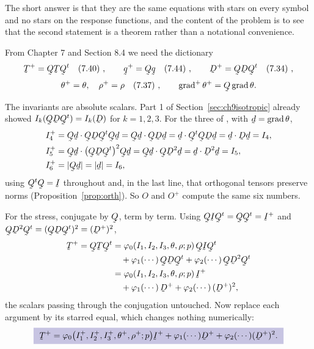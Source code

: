 \begin{solution}
The short answer is that they are the same equations with stars on every
symbol and no stars on the response functions, and the content of
the problem is to see that the second statement is a theorem rather than
a notational convenience.

From Chapter 7 and Section 8.4 we need the dictionary
\[
   \bT^{+}=\bQ\bT\bQ^{t}\ \eqr{7.40},\qquad
   \bq^{+}=\bQ\bq\ \eqr{7.44},\qquad
   \bD^{+}=\bQ\bD\bQ^{t}\ \eqr{7.34},
\]
\[
   \theta^{+}=\theta,\quad \rho^{+}=\rho\ \eqr{7.37},\qquad
   \grad^{+}\theta^{+}=\bQ\grad\theta .
\]

The invariants are absolute scalars. Part 1 of
Section~\ref{sec:ch9isotropic} already showed
$I_{k}(\bQ\bD\bQ^{t})=I_{k}(\bD)$ for $k=1,2,3$. For the three of
, with $\bd=\grad\theta$,
\[
\begin{aligned}
   I_{4}^{+}&=\ip{\bQ\bd}{\bQ\bD\bQ^{t}\bQ\bd}
     =\ip{\bQ\bd}{\bQ\bD\bd}=\ip\bd{\bQ^{t}\bQ\bD\bd}
     =\ip\bd{\bD\bd}=I_{4},\\
   I_{5}^{+}&=\ip{\bQ\bd}{\big(\bQ\bD\bQ^{t}\big)^{2}\bQ\bd}
     =\ip{\bQ\bd}{\bQ\bD^{2}\bd}=\ip\bd{\bD^{2}\bd}=I_{5},\\
   I_{6}^{+}&=|\bQ\bd|=|\bd|=I_{6},
\end{aligned}
\]
using $\bQ^{t}\bQ=\I$ throughout and, in the last line, that orthogonal
tensors preserve norms (Proposition~\ref{prop:orth}). So $O$ and
$O^{+}$ compute the same six numbers.

For the stress, conjugate  by $\bQ$, term by term. Using
$\bQ\I\bQ^{t}=\bQ\bQ^{t}=\I^{+}$ and
$\bQ\bD^{2}\bQ^{t}=(\bQ\bD\bQ^{t})^{2}=(\bD^{+})^{2}$,
\[
\begin{aligned}
   \bT^{+}=\bQ\bT\bQ^{t}
   &=\varphi_{0}(I_{1},I_{2},I_{3},\theta,\rho;p)\,\bQ\I\bQ^{t}\\
   &\quad+\varphi_{1}(\cdots)\,\bQ\bD\bQ^{t}
    +\varphi_{2}(\cdots)\,\bQ\bD^{2}\bQ^{t}\\
   &=\varphi_{0}(I_{1},I_{2},I_{3},\theta,\rho;p)\,\I^{+}\\
   &\quad+\varphi_{1}(\cdots)\,\bD^{+}
    +\varphi_{2}(\cdots)\,(\bD^{+})^{2},
\end{aligned}
\]
the scalars passing through the conjugation untouched. Now replace each
argument by its starred equal, which changes nothing numerically:
\[
   \boxed{\
   \bT^{+}=\varphi_{0}\big(I^{+}_{1},I^{+}_{2},I^{+}_{3},
     \theta^{+},\rho^{+};p\big)\I^{+}
   +\varphi_{1}(\cdots)\bD^{+}
   +\varphi_{2}(\cdots)(\bD^{+})^{2}. \ }
\]


\end{solution}
